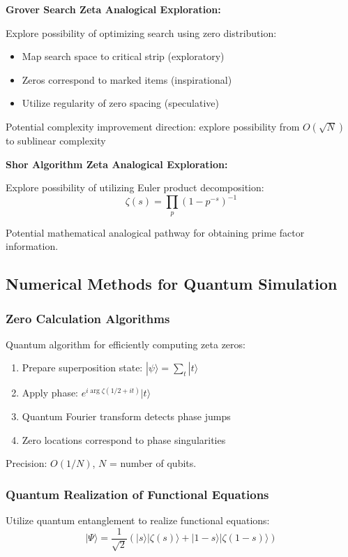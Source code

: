 \documentclass[11pt]{article}
\theoremstyle{plain}
\theoremstyle{definition}
\theoremstyle{remark}
\begin{document}
\textbf{Grover Search Zeta Analogical Exploration:}

Explore possibility of optimizing search using zero distribution:
\begin{itemize}
\item Map search space to critical strip (exploratory)
\item Zeros correspond to marked items (inspirational)
\item Utilize regularity of zero spacing (speculative)
\end{itemize}

Potential complexity improvement direction: explore possibility from $O(\sqrt{N})$ to sublinear complexity

\textbf{Shor Algorithm Zeta Analogical Exploration:}

Explore possibility of utilizing Euler product decomposition:
$$\zeta(s) = \prod_p (1-p^{-s})^{-1}$$

Potential mathematical analogical pathway for obtaining prime factor information.

\subsection{Numerical Methods for Quantum Simulation}

\subsubsection{Zero Calculation Algorithms}

Quantum algorithm for efficiently computing zeta zeros:

\begin{enumerate}
\item Prepare superposition state: $|\psi\rangle = \sum_t |t\rangle$
\item Apply phase: $e^{i\arg\zeta(1/2+it)}|t\rangle$
\item Quantum Fourier transform detects phase jumps
\item Zero locations correspond to phase singularities
\end{enumerate}

Precision: $O(1/N)$, $N$ = number of qubits.

\subsubsection{Quantum Realization of Functional Equations}

Utilize quantum entanglement to realize functional equations:
$$|\Psi\rangle = \frac{1}{\sqrt{2}}(|s\rangle|\zeta(s)\rangle + |1-s\rangle|\zeta(1-s)\rangle)$$
\end{document}
